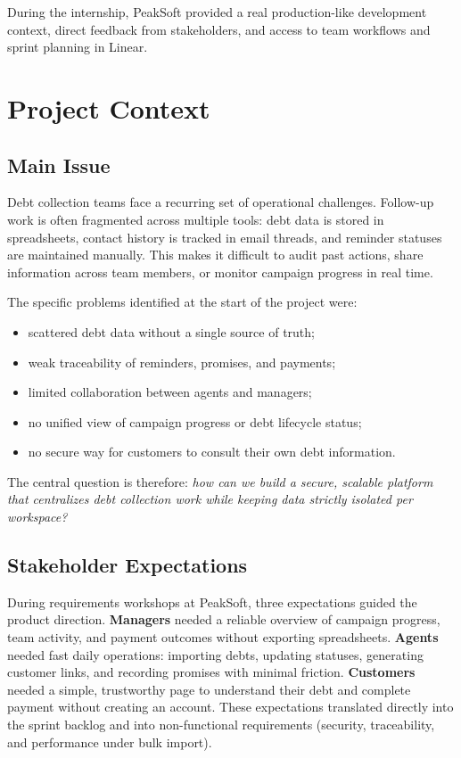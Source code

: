 \documentclass[12pt,a4paper]{report}
\begin{document}
During the internship, PeakSoft provided a real production-like development context,
direct feedback from stakeholders, and access to team workflows and sprint planning
in Linear.

\section{Project Context}

\subsection{Main Issue}

Debt collection teams face a recurring set of operational challenges.
Follow-up work is often fragmented across multiple tools: debt data is stored in
spreadsheets, contact history is tracked in email threads, and reminder statuses are
maintained manually.
This makes it difficult to audit past actions, share information across team members,
or monitor campaign progress in real time.

The specific problems identified at the start of the project were:
\begin{itemize}
  \item scattered debt data without a single source of truth;
  \item weak traceability of reminders, promises, and payments;
  \item limited collaboration between agents and managers;
  \item no unified view of campaign progress or debt lifecycle status;
  \item no secure way for customers to consult their own debt information.
\end{itemize}

The central question is therefore: \emph{how can we build a secure, scalable platform
that centralizes debt collection work while keeping data strictly isolated per workspace?}

\subsection{Stakeholder Expectations}

During requirements workshops at PeakSoft, three expectations guided the product direction.
\textbf{Managers} needed a reliable overview of campaign progress, team activity, and payment
outcomes without exporting spreadsheets.
\textbf{Agents} needed fast daily operations: importing debts, updating statuses, generating
customer links, and recording promises with minimal friction.
\textbf{Customers} needed a simple, trustworthy page to understand their debt and complete
payment without creating an account.
These expectations translated directly into the sprint backlog and into non-functional
requirements (security, traceability, and performance under bulk import).
\end{document}
